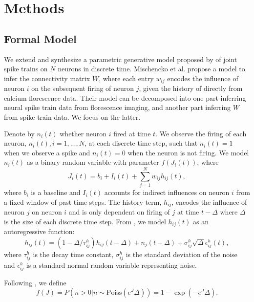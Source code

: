 \documentclass{article}
\begin{document}
\section{Methods}

\subsection{Formal Model}
We extend and synthesize a parametric generative model proposed by
\citep{mishchencko2011} of joint spike trains on $N$ neurons in
discrete time. Mischencko
et al. propose a model to infer the connectivity matrix $W$, where
each entry $w_{ij}$ encodes the influence of neuron $i$ on the subsequent
firing of neuron $j$, given the history of directly from calcium
florescence data. Their model can be decomposed into one part
inferring neural spike train data from florescence imaging, and
another part inferring $W$ from spike train data. We focus on the
latter.

Denote by $ n_i(t) $ whether neuron $i$ fired at time $t$. We observe
the firing of each neuron, $n_i(t), i = 1,...,N$, at each discrete time step, such that $n_i(t) = 1$ when we observe a spike and $n_i(t) = 0$ when the neuron is not firing. We model $n_i(t)$ as a
binary random variable with parameter $f(J_i(t))$, where
\begin{equation}\label{J}  J_i(t) = b_i + I_i(t) + \sum_{j=1}^{N}
w_{ij}h_{ij}(t), \end{equation} where $b_i$ is a baseline and $I_i(t)$
accounts for indirect influences on neuron $i$ from a fixed window of
past time steps. The history term, $h_{ij}$, encodes
the influence of neuron $j$ on neuron $i$ and is only dependent on firing of $j$ at time $t-\Delta$ where $\Delta$ is the size of each discrete time step.
From \citep{mishchencko2011}, we model $h_{ij}(t)$ as an autoregressive function: \begin{equation}\label{h} h_{ij}(t) = (1-\Delta/\tau_{ij}^h)h_{ij}(t-\Delta)
  + n_j(t-\Delta)+\sigma_{ij}^h\sqrt{\Delta}\epsilon_{ij}^h(t), \end{equation}
where $ \tau_{ij}^h $ is the decay time constant, $\sigma_{ij}^h$ is the
standard deviation of the noise and $\epsilon_{ij}^h$ is a standard
normal random variable representing noise.

Following \citep{mishchencko2011}, we define \begin{equation}
\label{f} f(J) = P\left(n>0 | n \sim \text{Poiss}(e^J\Delta)\right) = 1 - \exp(-e^J\Delta). \end{equation}
\end{document}
